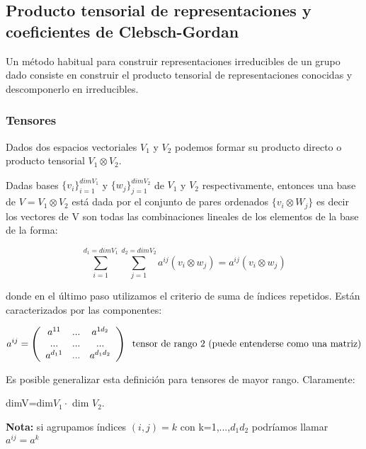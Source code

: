 \documentclass{article}
\begin{document}
    \subsection{Producto tensorial de representaciones y coeficientes de Clebsch-Gordan}

    Un método habitual para construir representaciones irreducibles de un grupo dado consiste en construir el producto tensorial de representaciones conocidas y descomponerlo en irreducibles.

    \subsubsection{Tensores}

    Dados dos espacios vectoriales $V_1$ y $V_2$ podemos formar su producto directo o producto tensorial $V_1 \otimes V_2$.

    Dadas bases $\lbrace v_i\rbrace _{i=1}^{dim V_1}$ y $\lbrace w_j\rbrace _{j=1}^{dim V_2}$ de $V_1$ y $V_2$ respectivamente, entonces una base de $V=V_1 \otimes V_2$ está dada por el conjunto de pares ordenados $\lbrace v_i \otimes W_j \rbrace$ es decir los vectores de V son todas las combinaciones lineales de los elementos de la base de la forma:

    $$\sum _{i=1}^{d_1=dim V_1}\sum _{j=1}^{d_2=dimV_2} a^{ij}(v_i\otimes w_j)=a^{ij}(v_i \otimes w_j)$$

    donde en el último paso utilizamos el criterio de suma de índices repetidos. Están caracterizados por las componentes:

    $$a^{ij}=\left ( \begin{array}{ccc}
        a^{11} & ... & a^{1d_2} \\
        ... & ... & ... \\
        a^{d_11} & ... & a^{d_1d_2}
    \end{array}\right) \hspace{0.2cm} \text{tensor de rango 2 (puede entenderse como una matriz)}$$

    \smallskip

    Es posible generalizar esta definición para tensores de mayor rango. Claramente:
    \begin{center}
    dimV=dim$V_1 \cdot $ dim $V_2$.

    \end{center}

    \textbf{Nota:} si agrupamos índices $(i,j)=k$ con k=1,...,$d_1d_2$ podríamos llamar $a^{ij}=a^k$
\end{document}
